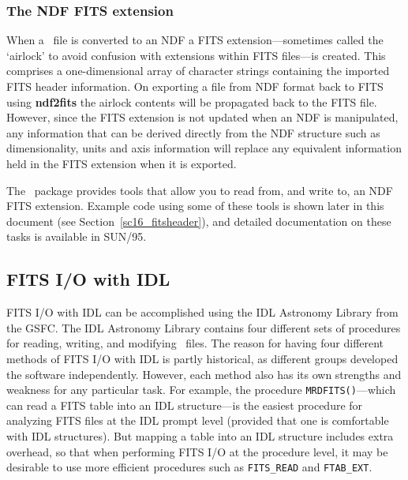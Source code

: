 \documentclass[twoside,11pt]{article}
\newcommand{\htmladdnormallink}[2]{#1}
\newcommand{\htmlref}[2]{#1}
\newcommand{\latex}[1]{#1}
\newcommand{\xref}[3]{#1}
\newcommand{\xlabel}[1]{}
\begin{document}
\subsubsection{The NDF FITS extension}

When a \FITSref\ file is converted to an \xref{NDF}{sun33}{} a FITS
extension---sometimes called the `airlock' to avoid confusion with
extensions within FITS files---is created.  This comprises a
one-dimensional array of character strings containing the imported
FITS header information.  On exporting a file from NDF format back to
FITS using \xref{{\bf ndf2fits}}{sun55}{NDF2FITS} the airlock contents
will be propagated back to the FITS file.  However, since the FITS
extension is not updated when an NDF is manipulated, any information
that can be derived directly from the NDF structure such as
dimensionality, units and axis information will replace any equivalent
information held in the FITS extension when it is exported.

The \KAPPAref\ package provides tools that allow you to read from, and
write to, an NDF FITS extension.  Example code using some of these
tools is shown later in this
\htmlref{document}{sc16_fitsheader}\latex{ (see
Section~\ref{sc16_fitsheader})}, and detailed documentation on these
tasks is available in \xref{SUN/95}{sun95}{se_fitsairlock}.

\subsection{\xlabel{sc16_fitsidl}FITS I/O with IDL\label{sc16_fitsidl}}

\htmladdnormallink{FITS
I/O}{http://idlastro.gsfc.nasa.gov/fitsio.html} with IDL can be
accomplished using the \htmladdnormallink{IDL Astronomy
Library}{http://idlastro.gsfc.nasa.gov/homepage.html} from the GSFC.
The IDL Astronomy Library contains four different sets of procedures
for reading, writing, and modifying \FITSref\ files.  The reason for having
four different methods of FITS I/O with IDL is partly historical, as
different groups developed the software independently.  However, each
method also has its own strengths and weakness for any particular
task.  For example, the procedure {\tt MRDFITS()}---which can read a
FITS table into an IDL structure---is the easiest procedure for
analyzing FITS files at the IDL prompt level (provided that one is
comfortable with IDL structures).  But mapping a table into an IDL
structure includes extra overhead, so that when performing FITS I/O at
the procedure level, it may be desirable to use more efficient
procedures such as {\tt FITS\_READ} and {\tt FTAB\_EXT}.
\end{document}
